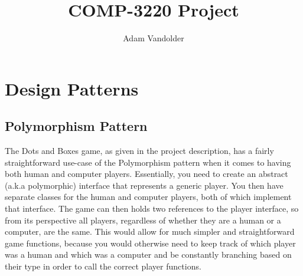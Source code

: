 \documentclass{article}
\title{COMP-3220 Project}
\author{Adam Vandolder}
\begin{document}
    \maketitle
    \tableofcontents
    \newpage
    \linespread{1.6}
    \selectfont
    \section{Design Patterns}
    \subsection{Polymorphism Pattern}
    The Dots and Boxes game, as given in the project description, has a fairly
    straightforward use-case of the Polymorphism pattern when it comes to having
    both human and computer players. Essentially, you need to create an abstract
    (a.k.a polymorphic) interface that represents a generic player. You then
    have separate classes for the human and computer players, both of which
    implement that interface. The game can then holds two references to the
    player interface, so from its perspective all players, regardless of whether
    they are a human or a computer, are the same. This would allow for much
    simpler and straightforward game functions, because you would otherwise need
    to keep track of which player was a human and which was a computer and be
    constantly branching based on their type in order to call the correct player
    functions.
    \newpage
\end{document}
